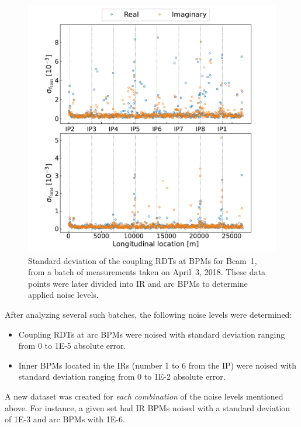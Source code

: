 \begin{figure}[!htb]
    \centering
    \includegraphics*[width=\textwidth]{Figures/ML_for_IR_Coupling/ml_rdts_batch_stdev.pdf}
    \caption{Standard deviation of the coupling RDTs at BPMs for Beam~\num{1}, from a batch of measurements taken on April~\num{3}, \num{2018}. These data points were later divided into IR and arc BPMs to determine applied noise levels.}
    \label{figure:rdts_stdev_batch}
\end{figure}

After analyzing several such batches, the following noise levels were determined:
\begin{itemize}
  \item Coupling RDTs at arc BPMs were noised with standard deviation ranging from \num{0} to \num{1E-5} absolute error.
  \item Inner BPMs located in the IRs (number \num{1} to \num{6} from the IP) were noised with standard deviation ranging from \num{0} to \num{1E-2} absolute error.
\end{itemize}

A new dataset was created for \textit{each combination} of the noise levels mentioned above.
For instance, a given set had IR BPMs noised with a standard deviation of \num{1E-3} and arc BPMs with \num{1E-6}.

